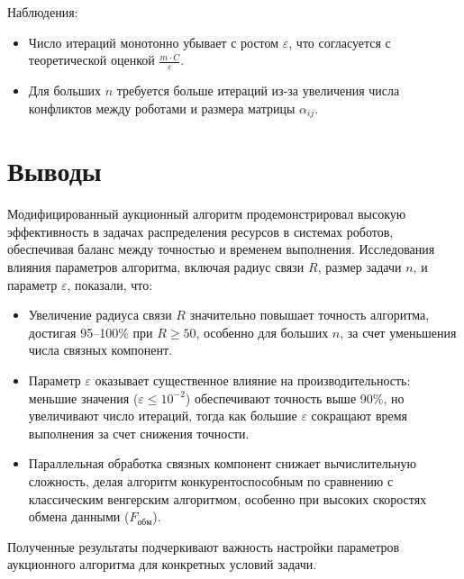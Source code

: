 Наблюдения:
\begin{itemize}
    \item Число итераций монотонно убывает с ростом \( \varepsilon \), что согласуется с теоретической оценкой \( \frac{m \cdot C}{\varepsilon} \).
    \item Для больших \( n \) требуется больше итераций из-за увеличения числа конфликтов между роботами и размера матрицы \( \alpha_{ij} \).
\end{itemize}



\section{Выводы}

Модифицированный аукционный алгоритм продемонстрировал высокую эффективность в задачах распределения ресурсов в системах роботов, обеспечивая баланс между точностью и временем выполнения. Исследования влияния параметров алгоритма, включая радиус связи $ R $, размер задачи $ n $, и параметр $ \varepsilon $, показали, что:
\begin{itemize}
\item Увеличение радиуса связи $ R $ значительно повышает точность алгоритма, достигая 95–100\% при $ R \geq 50 $, особенно для больших $ n $, за счет уменьшения числа связных компонент.
\item Параметр $ \varepsilon $ оказывает существенное влияние на производительность: меньшие значения ($ \varepsilon \leq 10^{-2} $) обеспечивают точность выше 90\%, но увеличивают число итераций, тогда как большие $ \varepsilon $ сокращают время выполнения за счет снижения точности.
\item Параллельная обработка связных компонент снижает вычислительную сложность, делая алгоритм конкурентоспособным по сравнению с классическим венгерским алгоритмом, особенно при высоких скоростях обмена данными ($ F_{\text{обм}} $).
\end{itemize}
Полученные результаты подчеркивают важность настройки параметров аукционного алгоритма для конкретных условий задачи. 